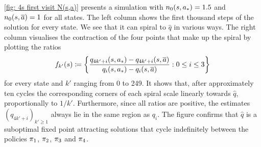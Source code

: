 \autoref{fig: 4s first visit N(s,a)} presents a simulation with $n_0(s, {a}_*) = 1.5$ and $n_0(s, \overline{a}) = 1$ for all states.
The left column shows the first thousand steps of the solution for every state.
We see that it can spiral to $\hat{q}$ in various ways.
The right column visualises the contraction of the four points that make up the spiral by plotting the ratios
\begin{align}
\label{eq: ratios of corners of spiral}
    f_{k'}(s) \coloneqq \bigg\{ \dfrac{q_{4k'+i}(s,{a}_*) - q_{4k'+i}(s,\overline{a})}{q_{i}(s,{a}_*) - q_{i}(s,\overline{a})} : 0 \leq i \leq 3 \bigg\}
\end{align}
for every state and $k'$ ranging from 0 to 249.
It shows that, after approximately ten cycles the corresponding corners of each spiral scale linearly towards $\hat{q}$, proportionally to $1/k'$.
Furthermore, since all ratios are positive, the estimates $(q_{4k'+i})_{k'\geq 1}$ always lie in the same region as $q_i$.
The figure confirms that $\hat{q}$ is a suboptimal fixed point attracting solutions that cycle indefinitely between the policies $\pi_1$, $\pi_2$, $\pi_3$ and $\pi_4$.






